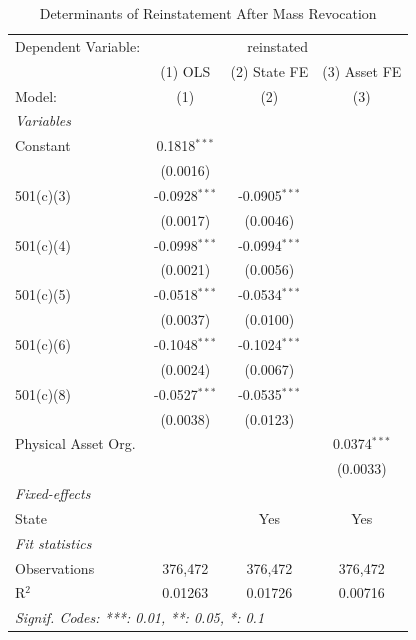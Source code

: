 
\begin{table}[htbp]
   \caption{\label{tab:regression} Determinants of Reinstatement After Mass Revocation}
   \centering
   \begin{tabular}{lccc}
      \tabularnewline \midrule \midrule
      Dependent Variable: & \multicolumn{3}{c}{reinstated}\\
                          & (1) OLS         & (2) State FE    & (3) Asset FE \\   
      Model:              & (1)             & (2)             & (3)\\  
      \midrule
      \emph{Variables}\\
      Constant            & 0.1818$^{***}$  &                 &   \\   
                          & (0.0016)        &                 &   \\   
      501(c)(3)           & -0.0928$^{***}$ & -0.0905$^{***}$ &   \\   
                          & (0.0017)        & (0.0046)        &   \\   
      501(c)(4)           & -0.0998$^{***}$ & -0.0994$^{***}$ &   \\   
                          & (0.0021)        & (0.0056)        &   \\   
      501(c)(5)           & -0.0518$^{***}$ & -0.0534$^{***}$ &   \\   
                          & (0.0037)        & (0.0100)        &   \\   
      501(c)(6)           & -0.1048$^{***}$ & -0.1024$^{***}$ &   \\   
                          & (0.0024)        & (0.0067)        &   \\   
      501(c)(8)           & -0.0527$^{***}$ & -0.0535$^{***}$ &   \\   
                          & (0.0038)        & (0.0123)        &   \\   
      Physical Asset Org. &                 &                 & 0.0374$^{***}$\\   
                          &                 &                 & (0.0033)\\   
      \midrule
      \emph{Fixed-effects}\\
      State               &                 & Yes             & Yes\\  
      \midrule
      \emph{Fit statistics}\\
      Observations        & 376,472         & 376,472         & 376,472\\  
      R$^2$               & 0.01263         & 0.01726         & 0.00716\\  
      \midrule \midrule
      \multicolumn{4}{l}{\emph{Signif. Codes: ***: 0.01, **: 0.05, *: 0.1}}\\
   \end{tabular}
   

\end{table}
